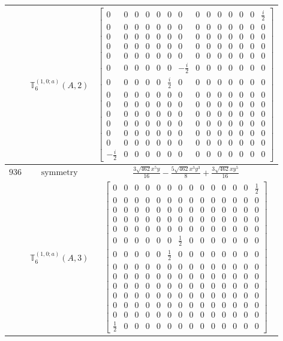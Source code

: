 \documentclass[fleqn,8pt,landscape]{jsarticle}
\begin{document}
\begin{longtable}{ccc}
$  $ & $ \mathbb{T}_{6}^{(1,0;a)}(A,2) $ & $ \begin{bmatrix} 0 & 0 & 0 & 0 & 0 & 0 & 0 & 0 & 0 & 0 & 0 & 0 & 0 & \frac{i}{2} \\ 0 & 0 & 0 & 0 & 0 & 0 & 0 & 0 & 0 & 0 & 0 & 0 & 0 & 0 \\ 0 & 0 & 0 & 0 & 0 & 0 & 0 & 0 & 0 & 0 & 0 & 0 & 0 & 0 \\ 0 & 0 & 0 & 0 & 0 & 0 & 0 & 0 & 0 & 0 & 0 & 0 & 0 & 0 \\ 0 & 0 & 0 & 0 & 0 & 0 & 0 & 0 & 0 & 0 & 0 & 0 & 0 & 0 \\ 0 & 0 & 0 & 0 & 0 & 0 & - \frac{i}{2} & 0 & 0 & 0 & 0 & 0 & 0 & 0 \\ 0 & 0 & 0 & 0 & 0 & \frac{i}{2} & 0 & 0 & 0 & 0 & 0 & 0 & 0 & 0 \\ 0 & 0 & 0 & 0 & 0 & 0 & 0 & 0 & 0 & 0 & 0 & 0 & 0 & 0 \\ 0 & 0 & 0 & 0 & 0 & 0 & 0 & 0 & 0 & 0 & 0 & 0 & 0 & 0 \\ 0 & 0 & 0 & 0 & 0 & 0 & 0 & 0 & 0 & 0 & 0 & 0 & 0 & 0 \\ 0 & 0 & 0 & 0 & 0 & 0 & 0 & 0 & 0 & 0 & 0 & 0 & 0 & 0 \\ 0 & 0 & 0 & 0 & 0 & 0 & 0 & 0 & 0 & 0 & 0 & 0 & 0 & 0 \\ 0 & 0 & 0 & 0 & 0 & 0 & 0 & 0 & 0 & 0 & 0 & 0 & 0 & 0 \\ - \frac{i}{2} & 0 & 0 & 0 & 0 & 0 & 0 & 0 & 0 & 0 & 0 & 0 & 0 & 0 \end{bmatrix} $ \\ \hline
$ 936 $ & $ \text{symmetry} $ & $ \frac{3 \sqrt{462} x^{5} y}{16} - \frac{5 \sqrt{462} x^{3} y^{3}}{8} + \frac{3 \sqrt{462} x y^{5}}{16} $ \\
$  $ & $ \mathbb{T}_{6}^{(1,0;a)}(A,3) $ & $ \begin{bmatrix} 0 & 0 & 0 & 0 & 0 & 0 & 0 & 0 & 0 & 0 & 0 & 0 & 0 & \frac{1}{2} \\ 0 & 0 & 0 & 0 & 0 & 0 & 0 & 0 & 0 & 0 & 0 & 0 & 0 & 0 \\ 0 & 0 & 0 & 0 & 0 & 0 & 0 & 0 & 0 & 0 & 0 & 0 & 0 & 0 \\ 0 & 0 & 0 & 0 & 0 & 0 & 0 & 0 & 0 & 0 & 0 & 0 & 0 & 0 \\ 0 & 0 & 0 & 0 & 0 & 0 & 0 & 0 & 0 & 0 & 0 & 0 & 0 & 0 \\ 0 & 0 & 0 & 0 & 0 & 0 & \frac{1}{2} & 0 & 0 & 0 & 0 & 0 & 0 & 0 \\ 0 & 0 & 0 & 0 & 0 & \frac{1}{2} & 0 & 0 & 0 & 0 & 0 & 0 & 0 & 0 \\ 0 & 0 & 0 & 0 & 0 & 0 & 0 & 0 & 0 & 0 & 0 & 0 & 0 & 0 \\ 0 & 0 & 0 & 0 & 0 & 0 & 0 & 0 & 0 & 0 & 0 & 0 & 0 & 0 \\ 0 & 0 & 0 & 0 & 0 & 0 & 0 & 0 & 0 & 0 & 0 & 0 & 0 & 0 \\ 0 & 0 & 0 & 0 & 0 & 0 & 0 & 0 & 0 & 0 & 0 & 0 & 0 & 0 \\ 0 & 0 & 0 & 0 & 0 & 0 & 0 & 0 & 0 & 0 & 0 & 0 & 0 & 0 \\ 0 & 0 & 0 & 0 & 0 & 0 & 0 & 0 & 0 & 0 & 0 & 0 & 0 & 0 \\ \frac{1}{2} & 0 & 0 & 0 & 0 & 0 & 0 & 0 & 0 & 0 & 0 & 0 & 0 & 0 \end{bmatrix} $ \\ \hline

\end{longtable}
\end{document}
